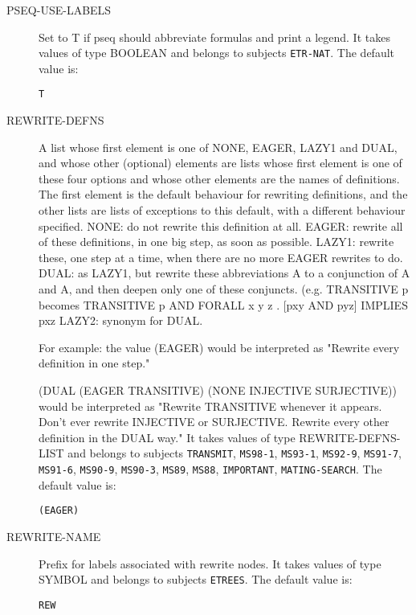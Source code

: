 \begin{description}
\item[PSEQ-USE-LABELS]  
Set to T if pseq should abbreviate formulas and print a legend.
It takes values of type BOOLEAN and belongs to subjects \texttt{ETR-NAT}.  The default value is: \begin{lstlisting}
T
\end{lstlisting}

\item[REWRITE-DEFNS]  
A list whose first element is one of NONE, EAGER, LAZY1 and DUAL,
and whose other (optional) elements are lists whose first element is
one of these four options and whose other elements are the names of 
definitions.
The first element is the default behaviour for rewriting definitions,
and the other lists are lists of exceptions to this default, with a
different behaviour specified.
NONE:  do not rewrite this definition at all.
EAGER: rewrite all of these definitions, in one big step, as soon 
       as possible.
LAZY1: rewrite these, one step at a time, when there are no more
       EAGER rewrites to do.
DUAL: as LAZY1, but rewrite these abbreviations A to a conjunction of
       A and A, and then deepen only one of these conjuncts. (e.g.
       TRANSITIVE p becomes 
       TRANSITIVE p AND FORALL x y z . [pxy AND pyz] IMPLIES pxz
LAZY2: synonym for DUAL.

For example: the value
(EAGER)
would be interpreted as "Rewrite every definition in one step."

(DUAL (EAGER TRANSITIVE) (NONE INJECTIVE SURJECTIVE))
would be interpreted as "Rewrite TRANSITIVE whenever it appears.
Don't ever rewrite INJECTIVE or SURJECTIVE. Rewrite every other 
definition in the DUAL way."
It takes values of type REWRITE-DEFNS-LIST and belongs to subjects \texttt{TRANSMIT}, \texttt{MS98-1}, \texttt{MS93-1}, \texttt{MS92-9}, \texttt{MS91-7}, \texttt{MS91-6}, \texttt{MS90-9}, \texttt{MS90-3}, \texttt{MS89}, \texttt{MS88}, \texttt{IMPORTANT}, \texttt{MATING-SEARCH}.  The default value is: \begin{lstlisting}
(EAGER)
\end{lstlisting}

\item[REWRITE-NAME]  
Prefix for labels associated with rewrite nodes.
It takes values of type SYMBOL and belongs to subjects \texttt{ETREES}.  The default value is: \begin{lstlisting}
REW
\end{lstlisting}


\end{description}
